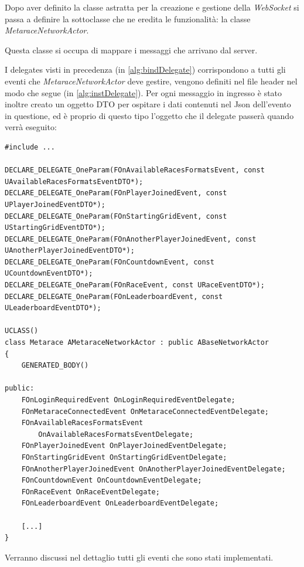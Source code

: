     Dopo aver definito la classe astratta per la creazione e gestione della \textit{WebSocket} si passa a definire la sottoclasse che ne eredita le funzionalità: la classe \textit{MetaraceNetworkActor}.

    Questa classe si occupa di mappare i messaggi che arrivano dal server.

    I delegates visti in precedenza (in \ref{alg:bindDelegate}) corrispondono a tutti gli eventi che \textit{MetaraceNetworkActor} deve gestire, vengono definiti nel file header nel modo che segue (in \ref{alg:instDelegate}). 
    Per ogni messaggio in ingresso è stato inoltre creato un oggetto DTO per ospitare i dati contenuti nel Json dell'evento in questione, ed è proprio di questo tipo l'oggetto che il delegate passerà quando verrà eseguito:

\label{alg:instDelegate}
\begin{lstlisting}[caption = Dichiarazione delegate nel file header di MetaraceNetworkActor]
#include ...

DECLARE_DELEGATE_OneParam(FOnAvailableRacesFormatsEvent, const UAvailableRacesFormatsEventDTO*);
DECLARE_DELEGATE_OneParam(FOnPlayerJoinedEvent, const UPlayerJoinedEventDTO*);
DECLARE_DELEGATE_OneParam(FOnStartingGridEvent, const UStartingGridEventDTO*);
DECLARE_DELEGATE_OneParam(FOnAnotherPlayerJoinedEvent, const UAnotherPlayerJoinedEventDTO*);
DECLARE_DELEGATE_OneParam(FOnCountdownEvent, const UCountdownEventDTO*);
DECLARE_DELEGATE_OneParam(FOnRaceEvent, const URaceEventDTO*);
DECLARE_DELEGATE_OneParam(FOnLeaderboardEvent, const ULeaderboardEventDTO*);

UCLASS()
class Metarace AMetaraceNetworkActor : public ABaseNetworkActor
{
    GENERATED_BODY()

public:
    FOnLoginRequiredEvent OnLoginRequiredEventDelegate;
    FOnMetaraceConnectedEvent OnMetaraceConnectedEventDelegate;
    FOnAvailableRacesFormatsEvent 
        OnAvailableRacesFormatsEventDelegate;
    FOnPlayerJoinedEvent OnPlayerJoinedEventDelegate;
    FOnStartingGridEvent OnStartingGridEventDelegate;
    FOnAnotherPlayerJoinedEvent OnAnotherPlayerJoinedEventDelegate;
    FOnCountdownEvent OnCountdownEventDelegate;
    FOnRaceEvent OnRaceEventDelegate;
    FOnLeaderboardEvent OnLeaderboardEventDelegate;

    [...]
}
\end{lstlisting}

    Verranno discussi nel dettaglio tutti gli eventi che sono stati implementati.


